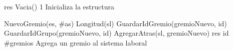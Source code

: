 {
	\state res \asig Vacia()								
}
{1}
{Inicializa la estructura}

{	
	\state {} \asig NuevoGremio(es, \#as) 								
	\state {} \asig Longitud(sl) 								
	\state GuardarIdGremio(gremioNuevo, id) 								
	\state GuardarIdGrupo(gremioNuevo, id) 								
	\state AgregarAtras(sl, gremioNuevo) 								
	\state res \asig id 								
}
{\#gremios}
{Agrega un gremio al sistema laboral}


